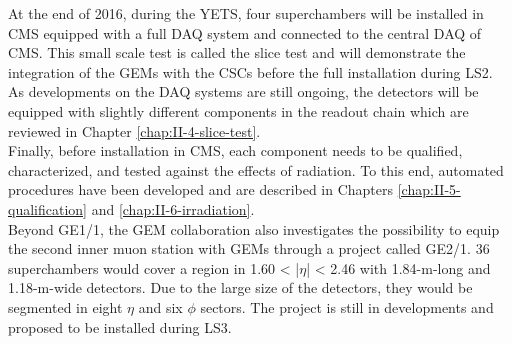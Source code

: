     At the end of 2016, during the YETS, four superchambers will be installed in CMS equipped with a full DAQ system and connected to the central DAQ of CMS. This small scale test is called the slice test and will demonstrate the integration of the GEMs with the CSCs before the full installation during LS2. As developments on the DAQ systems are still ongoing, the detectors will be equipped with slightly different components in the readout chain which are reviewed in Chapter \ref{chap:II-4-slice-test}. \\

    Finally, before installation in CMS, each component needs to be qualified, characterized, and tested against the effects of radiation. To this end, automated procedures have been developed and are described in Chapters \ref{chap:II-5-qualification} and \ref{chap:II-6-irradiation}. \\

    Beyond GE1/1, the GEM collaboration also investigates the possibility to equip the second inner muon station with GEMs through a project called GE2/1. 36 superchambers would cover a region in 1.60 < |$\eta$| < 2.46 with 1.84-m-long and 1.18-m-wide detectors. Due to the large size of the detectors, they would be segmented in eight $ \eta $ and six $ \phi $ sectors. The project is still in developments and proposed to be installed during LS3.
